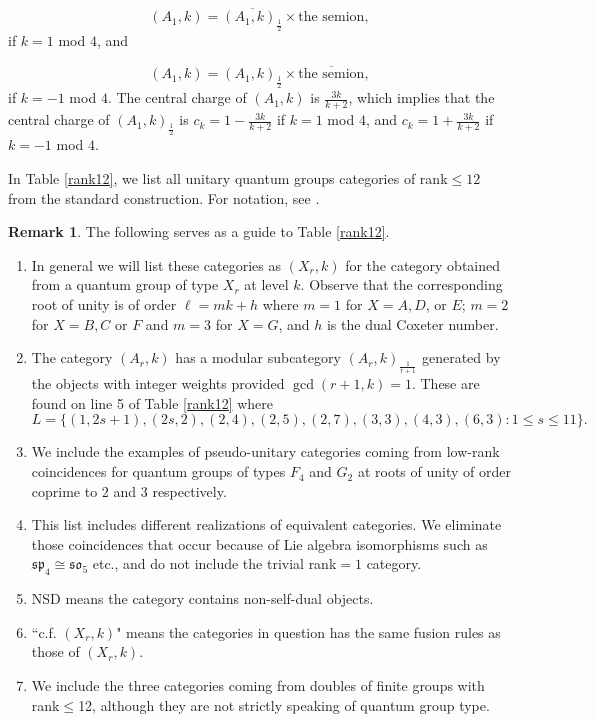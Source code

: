 \documentclass[12pt,psamsfonts]{amsart}
\numberwithin{equation}{section}
\theoremstyle{definition}
\newtheorem{remark}[theorem]{Remark}
\begin{document}
\begin{equation}\label{decom1}
(A_1,k)=\overline{ (A_1,k)_{\frac{1}{2}} }\times \textrm{the
semion},
\end{equation}
if $k=1$ mod $4$, and

\begin{equation}\label{decom2}
(A_1,k)=(A_1,k)_{\frac{1}{2}}\times \overline{\textrm{the
semion}},
\end{equation}
if $k=-1$ mod $4$.  The central charge of $(A_1,k)$ is
$\frac{3k}{k+2}$, which implies that the central charge of
$(A_1,k)_{\frac{1}{2}}$ is $c_k=1-\frac{3k}{k+2}$ if $k=1$ mod
$4$, and $c_k=1+\frac{3k}{k+2}$ if $k=-1$ mod $4$.

In Table \ref{rank12}, we list all unitary quantum groups categories of rank$\leq 12$ from the
standard construction.  For notation, see \cite{HRW}.

\begin{remark}  The following serves as a guide to Table \ref{rank12}.

\begin{enumerate}
\item In general we will list these categories as $(X_r,k)$ for the category obtained from
a quantum group of type $X_r$ at level $k$.  Observe that the corresponding root of unity
is of order $\ell=mk+h$ where $m=1$ for $X=A,D$, or $E$; $m=2$ for $X=B,C$ or $F$ and $m=3$ for $X=G$, and $h$ is the dual Coxeter number.


\item The category $(A_r,k)$ has a modular subcategory $(A_r,k)_{\frac{1}{r+1}}$ generated by the objects with integer weights provided $\gcd(r+1,k)=1$.  These are found on line 5 of Table \ref{rank12} where $$L=\{(1,2s+1),(2s,2),(2,4),(2,5),(2,7),(3,3),(4,3),(6,3): 1\leq s\leq 11\}.$$

\item We include the examples of pseudo-unitary categories coming from low-rank coincidences for quantum groups of types $F_4$ and $G_2$ at roots of unity of order coprime to $2$ and $3$ respectively.
\item This list includes different realizations of equivalent categories.  We eliminate those coincidences that occur because of Lie algebra isomorphisms
such as $\mathfrak{sp}_4\cong \mathfrak{so}_5$ etc., and do not include the trivial rank$=1$ category.
        \item NSD means the category contains non-self-dual objects.
        \item  ``c.f. $(X_r,k)$" means the
categories in question has the same fusion rules as those of $(X_r,k)$.
\item We include the three categories
coming from doubles of finite groups with rank$\leq$12, although they are not strictly speaking of quantum group type.
\end{enumerate}
\end{remark}
\end{document}
